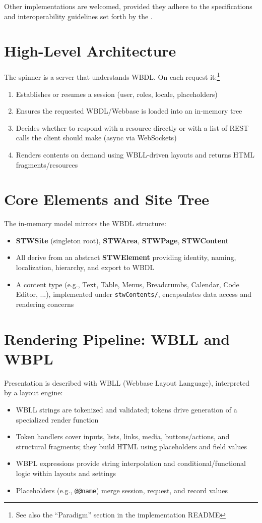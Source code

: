 Other implementations are welcomed, provided they adhere to the specifications and interoperability guidelines set forth by the \organization{}.

\section{High-Level Architecture}
The spinner is a server that understands WBDL. On each request it:\footnote{See also the ``Paradigm'' section in the implementation README}
\begin{enumerate}
	\item Establishes or resumes a session (user, roles, locale, placeholders)
	\item Ensures the requested WBDL/Webbase is loaded into an in-memory tree
	\item Decides whether to respond with a resource directly or with a list of REST calls the client should make (async via WebSockets)
	\item Renders contents on demand using WBLL-driven layouts and returns HTML fragments/resources
\end{enumerate}

\section{Core Elements and Site Tree}
The in-memory model mirrors the WBDL structure:
\begin{itemize}
	\item \textbf{STWSite} (singleton root), \textbf{STWArea}, \textbf{STWPage}, \textbf{STWContent}
	\item All derive from an abstract \textbf{STWElement} providing identity, naming, localization, hierarchy, and export to WBDL
	\item A content type (e.g., Text, Table, Menus, Breadcrumbs, Calendar, Code Editor, ...), implemented under \texttt{stwContents/}, encapsulates data access and rendering concerns
\end{itemize}

\section{Rendering Pipeline: WBLL and WBPL}
Presentation is described with WBLL (Webbase Layout Language), interpreted by a layout engine:
\begin{itemize}
	\item WBLL strings are tokenized and validated; tokens drive generation of a specialized render function
	\item Token handlers cover inputs, lists, links, media, buttons/actions, and structural fragments; they build HTML using placeholders and field values
	\item WBPL expressions provide string interpolation and conditional/functional logic within layouts and settings
	\item Placeholders (e.g., \verb|@@name|) merge session, request, and record values
\end{itemize}

